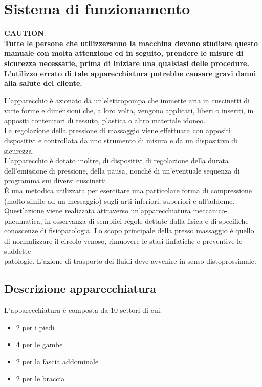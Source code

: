 \documentclass[a4paper]{article}
\begin{document}
\section{Sistema di funzionamento}
\noindent \faExclamationTriangle \textbf{CAUTION}:
\\
\textbf{Tutte le persone che utilizzeranno la macchina devono studiare questo manuale con molta attenzione ed in seguito, prendere le misure di sicurezza necessarie, prima di iniziare una qualsiasi delle procedure. L'utilizzo errato di tale apparecchiatura potrebbe causare gravi danni alla salute del cliente.}

\vspace{10pt}
L'apparecchio è azionato da un'elettropompa che immette aria in cuscinetti di varie forme e dimensioni che, a loro volta, vengono applicati, liberi o inseriti, in appositi contenitori di tessuto, plastica o altro materiale idoneo.\\
La regolazione della pressione di massaggio viene effettuata con appositi dispositivi e controllata da uno strumento di misura e da un dispositivo di sicurezza.\\
L'apparecchio è dotato inoltre, di dispositivi di regolazione della durata dell'emissione di pressione, della pausa, nonché di un'eventuale sequenza di programma sui diversi cuscinetti.\\
È una metodica utilizzata per esercitare una particolare forma di compressione (molto simile ad un messaggio) sugli arti inferiori, superiori e all'addome. Quest'azione viene realizzata attraverso un'apparecchiatura meccanico-pneumatica, in osservanza di semplici regole dettate dalla fisica e di specifiche conoscenze di fisiopatologia. Lo scopo principale della presso massaggio è quello di normalizzare il circolo venoso, rimuovere le stasi linfatiche e preventive le suddette\\
patologie. L'azione di trasporto dei fluidi deve avvenire in senso distoprossimale.

\subsection{Descrizione apparecchiatura}
L'apparecchiatura è composta da 10 settori di cui:

\begin{itemize}
  \item 2 per i piedi
  \item 4 per le gambe
  \item 2 per la fascia addominale
  \item 2 per le braccia
\end{itemize}
\end{document}
